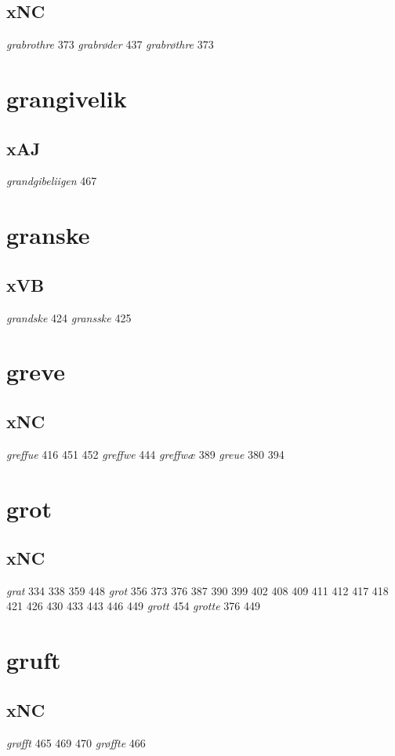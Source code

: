 \documentclass[a4paper,twocolumn]{article}
\begin{document}
\subsection{xNC}
\label{sec:org8729327}
\emph{grabrothre} 373 \emph{grabrøder} 437 \emph{grabrøthre} 373 
\section{grangivelik}
\label{sec:org11f1fea}
\subsection{xAJ}
\label{sec:org02f88d6}
\emph{grandgibeliigen} 467 
\section{granske}
\label{sec:org88c8d4e}
\subsection{xVB}
\label{sec:orgd05b746}
\emph{grandske} 424 \emph{gransske} 425 
\section{greve}
\label{sec:org5a52cfa}
\subsection{xNC}
\label{sec:org995055a}
\emph{greffue} 416 451 452 \emph{greffwe} 444 \emph{greffwæ} 389 \emph{greue} 380 394 
\section{grot}
\label{sec:orgc1af999}
\subsection{xNC}
\label{sec:org101e738}
\emph{grat} 334 338 359 448 \emph{grot} 356 373 376 387 390 399 402 408 409 411 412 417 418 421 426 430 433 443 446 449 \emph{grott} 454 \emph{grotte} 376 449 
\section{gruft}
\label{sec:orgf630db5}
\subsection{xNC}
\label{sec:org2545cb0}
\emph{grøfft} 465 469 470 \emph{grøffte} 466 
\end{document}
